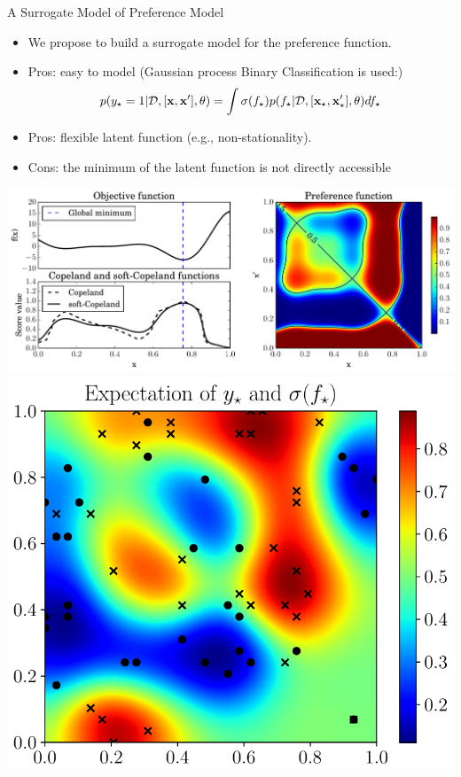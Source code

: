 \documentclass[13pt,aspectratio=1610]{beamer}
\begin{document}
\begin{frame}{A Surrogate Model of Preference Model}
\begin{minipage}{0.65\textwidth}

\begin{itemize}
\item We propose to build a surrogate model for the preference function.
\item Pros: easy to model (Gaussian process Binary Classification is used:)
$$p(y_{\star} = 1 | \mathcal{D},  [{\bf x},{\bf x}'], \theta) 
= \int \sigma(f_{\star}) p(f_{\star} | \mathcal{D}, [\mathbf{x}_{\star},\mathbf{x}_{\star}'], \theta) df_{\star}$$
\item Pros: flexible latent function (e.g., non-stationality).
\item Cons: the minimum of the latent function is not directly accessible
\end{itemize}
\end{minipage}
%
\begin{minipage}{0.33\textwidth}
\centering 
\includegraphics[width=1\textwidth]{duel_space.pdf} \\
\includegraphics[width=.93\textwidth]{exp_y_star_cropped.pdf} 
\end{minipage}
\end{frame}
\end{document}
